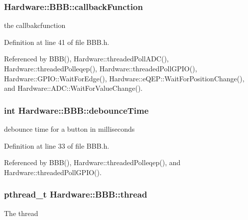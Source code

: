 \subsubsection[{callback\+Function}]{ Hardware\+::\+B\+B\+B\+::callback\+Function\hspace{0.3cm}{\ttfamily [protected]}}\label{class_hardware_1_1_b_b_b_a66d583952f3949a732ee15eea81e80e5}
the callbakcfunction 

Definition at line 41 of file B\+B\+B.\+h.



Referenced by B\+B\+B(), Hardware\+::threaded\+Poll\+A\+D\+C(), Hardware\+::threaded\+Polleqep(), Hardware\+::threaded\+Poll\+G\+P\+I\+O(), Hardware\+::\+G\+P\+I\+O\+::\+Wait\+For\+Edge(), Hardware\+::e\+Q\+E\+P\+::\+Wait\+For\+Position\+Change(), and Hardware\+::\+A\+D\+C\+::\+Wait\+For\+Value\+Change().

\hypertarget{class_hardware_1_1_b_b_b_a353a2d7d4fbade337e5173b484b20b22}{}
\subsubsection[{debounce\+Time}]{\setlength{\rightskip}{0pt plus 5cm}int Hardware\+::\+B\+B\+B\+::debounce\+Time}\label{class_hardware_1_1_b_b_b_a353a2d7d4fbade337e5173b484b20b22}
debounce time for a button in milliseconds 

Definition at line 33 of file B\+B\+B.\+h.



Referenced by B\+B\+B(), Hardware\+::threaded\+Polleqep(), and Hardware\+::threaded\+Poll\+G\+P\+I\+O().

\hypertarget{class_hardware_1_1_b_b_b_a3ad3fe886705bfc242ef58dc5329166e}{}
\subsubsection[{thread}]{\setlength{\rightskip}{0pt plus 5cm}pthread\+\_\+t Hardware\+::\+B\+B\+B\+::thread\hspace{0.3cm}{\ttfamily [protected]}}\label{class_hardware_1_1_b_b_b_a3ad3fe886705bfc242ef58dc5329166e}
The thread 

